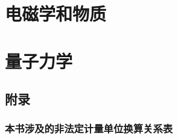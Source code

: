 \documentclass[UTF8, 12pt, a4paper, twoside]{ctexbook}
\begin{document}






































\part{电磁学和物质}

\graphicspath{{Figures/VolumeII}}




\part{量子力学}





\chapter*{附录}

\vspace{-20pt}

\section*{本书涉及的非法定计量单位换算关系表
}
\end{document}
